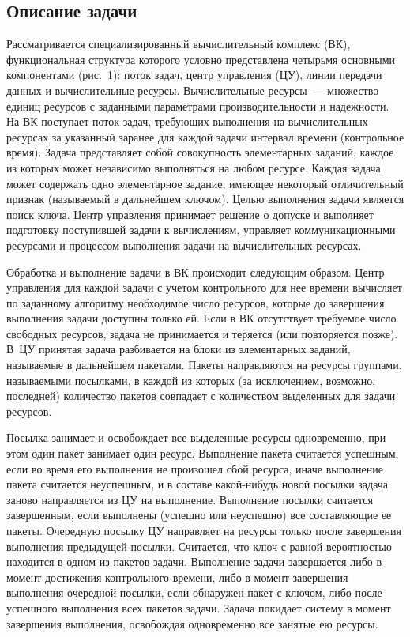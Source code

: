 \begin{multicols}{2}
\section{Описание задачи}

   Рассматривается специализированный вычислительный комплекс (ВК), 
функциональная структура которого условно представлена четырьмя 
основными компонентами (рис.~1): поток задач, центр управления (ЦУ), 
линии передачи данных и вычислительные ресурсы. Вычислительные 
ресурсы~--- множество единиц ресурсов с заданными параметрами 
производительности и надежности. На ВК поступает поток задач, требующих 
выполнения на вычислительных ресурсах за указанный заранее для каждой 
задачи интервал времени (контрольное время). Задача представляет собой 
совокупность элементарных заданий, каждое из которых может независимо 
выполняться на любом ресурсе. Каж\-дая задача может содержать одно 
элементарное задание, имеющее некоторый отличительный признак 
(называемый в дальнейшем ключом). Целью выполнения задачи является поиск 
ключа. Центр управ\-ле\-ния принимает решение о допуске и выполняет подготовку 
поступившей задачи к вычислениям, управляет коммуникационными 
ресурсами и процессом выполнения задачи на вычислительных ресурсах.


   
   Обработка и выполнение задачи в ВК происходит следующим образом. Центр управ\-ле\-ния
для каждой задачи с учетом контрольного для нее времени вычисляет по 
заданному алгоритму необходимое число ресурсов, которые до завершения 
выполнения задачи доступны только ей. Если в ВК отсутствует требуемое 
число свободных ресурсов, задача не принимается и теряется (или повторяется 
позже). В~ЦУ принятая задача разбивается на блоки из элементарных заданий, 
называемые в дальнейшем пакетами. Пакеты направляются на ресурсы 
группами, называемыми посылками, в каждой из которых (за исключением, 
возможно, последней) количество пакетов совпадает с количеством 
выделенных для задачи ресурсов.

Посылка занимает и освобождает все выделенные ресурсы одновременно, при 
этом один пакет занимает один ресурс. Выполнение пакета считается 
успешным, если во время его выполнения не произошел сбой ресурса, иначе 
выполнение пакета считается неуспешным, и в составе какой-нибудь новой 
посылки задача заново направляется из ЦУ на выполнение. Выполнение 
посылки считается завершенным, если выполнены (успешно или неуспешно) 
все составляющие ее пакеты. Очередную посылку ЦУ направляет на ресурсы 
только после завершения выполнения предыдущей посылки. Считается, что 
ключ с равной вероятностью находится в одном из пакетов задачи. Выполнение 
задачи завершается либо в момент достижения контрольного времени, либо в 
момент завершения выполнения очередной посылки, если обнаружен пакет с 
ключом, либо после успешного выполнения всех пакетов задачи. Задача 
покидает сис\-те\-му в момент завершения выполнения, освобождая одновременно 
все занятые ею ресурсы.
     

\end{multicols}

